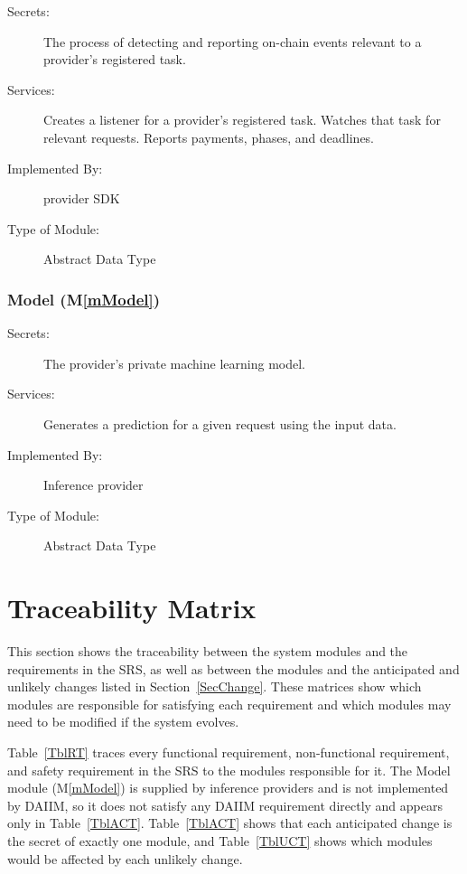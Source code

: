 \documentclass[12pt, titlepage]{article}
\newcommand{\mref}[1]{M\ref{#1}}
\begin{document}
\begin{description}
\item[Secrets:] The process of detecting and reporting on-chain events
  relevant to a provider's registered task.
\item[Services:] Creates a listener for a provider's registered task. Watches
  that task for relevant requests. Reports payments, phases, and deadlines.
\item[Implemented By:] \progname{} provider SDK
\item[Type of Module:] Abstract Data Type
\end{description}

\subsubsection{Model (\mref{mModel})}

\begin{description}
\item[Secrets:] The provider's private machine learning model.
\item[Services:] Generates a prediction for a given request using the input data.
\item[Implemented By:] Inference provider
\item[Type of Module:] Abstract Data Type
\end{description}

\section{Traceability Matrix} \label{SecTM}

This section shows the traceability between the system modules and the
requirements in the SRS, as well as between the modules and the anticipated
and unlikely changes listed in Section~\ref{SecChange}. These matrices show
which modules are responsible for satisfying each requirement and which
modules may need to be modified if the system evolves.

Table~\ref{TblRT} traces every functional requirement, non-functional
requirement, and safety requirement in the SRS to the modules responsible for
it. The Model module (\mref{mModel}) is supplied by inference providers and is
not implemented by DAIIM, so it does not satisfy any DAIIM requirement
directly and appears only in Table~\ref{TblACT}. Table~\ref{TblACT} shows that
each anticipated change is the secret of exactly one module, and
Table~\ref{TblUCT} shows which modules would be affected by each unlikely
change.
\end{document}
